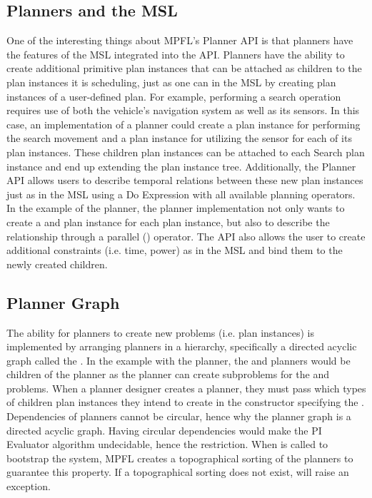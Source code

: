 \subsection{Planners and the MSL}
One of the interesting things about MPFL's Planner API is that planners have the features of the MSL integrated into the API.  Planners have the ability to create additional primitive plan instances that can be attached as children to the plan instances it is scheduling, just as one can in the MSL by creating plan instances of a user-defined plan. For example, performing a search operation requires use of both the vehicle's navigation system as well as its sensors. In this case, an implementation of a  planner could create a  plan instance for performing the search movement and a  plan instance for utilizing the sensor for each of its  plan instances. These children plan instances can be attached to each Search plan instance and end up extending the plan instance tree. Additionally, the Planner API allows users to describe temporal relations between these new plan instances just as in the MSL using a Do Expression with all available planning operators. In the example of the  planner, the planner implementation not only wants to create a  and  plan instance for each  plan instance, but also to describe the relationship through a parallel (\Code{||}) operator. The API also allows the user to create additional constraints (i.e. time, power) as in the MSL and bind them to the newly created children. 

\subsection{Planner Graph}
The ability for planners to create new problems (i.e. plan instances) is implemented by arranging planners in a hierarchy, specifically a directed acyclic graph called the . In the example with the  planner, the  and  planners would be children of the  planner as the  planner can create subproblems for the  and  problems. When a planner designer creates a planner, they must pass which types of children plan instances they intend to create in the constructor specifying the . Dependencies of planners cannot be circular, hence why the planner graph is a directed acyclic graph. Having circular dependencies would make the PI Evaluator algorithm undecidable, hence the restriction. When  is called to bootstrap the system, MPFL creates a topographical sorting of the planners to guarantee this property. If a topographical sorting does not exist,  will raise an exception.

